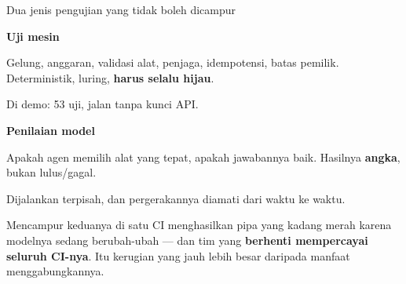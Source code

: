 \documentclass[aspectratio=169,11pt,t]{beamer}
\begin{document}
\begin{frame}[shrink=25]{Dua jenis pengujian yang tidak boleh dicampur}
\begin{minipage}[t]{0.485\textwidth}
{\fontsize{9.4}{12.6}\selectfont\color{fg2}\textbf{Uji mesin}\par}\vskip 4pt
{\fontsize{9.4}{12.6}\selectfont\color{fg2}Gelung, anggaran, validasi alat, penjaga, idempotensi, batas pemilik. Deterministik, luring, \textbf{harus selalu hijau}.\par}\vskip 4pt
{\fontsize{9.4}{12.6}\selectfont\color{fg2}Di demo: 53 uji, jalan tanpa kunci API.\par}\vskip 4pt

\end{minipage}%
\hfill
\begin{minipage}[t]{0.485\textwidth}
{\fontsize{9.4}{12.6}\selectfont\color{fg2}\textbf{Penilaian model}\par}\vskip 4pt
{\fontsize{9.4}{12.6}\selectfont\color{fg2}Apakah agen memilih alat yang tepat, apakah jawabannya baik. Hasilnya \textbf{angka}, bukan lulus/gagal.\par}\vskip 4pt
{\fontsize{9.4}{12.6}\selectfont\color{fg2}Dijalankan terpisah, dan pergerakannya diamati dari waktu ke waktu.\par}\vskip 4pt

\end{minipage}%
\begin{iband}[signal]
Mencampur keduanya di satu CI menghasilkan pipa yang kadang merah karena modelnya sedang berubah-ubah --- dan tim yang \textbf{berhenti mempercayai seluruh CI-nya}. Itu kerugian yang jauh lebih besar daripada manfaat menggabungkannya.
\end{iband}
\end{frame}
\end{document}
